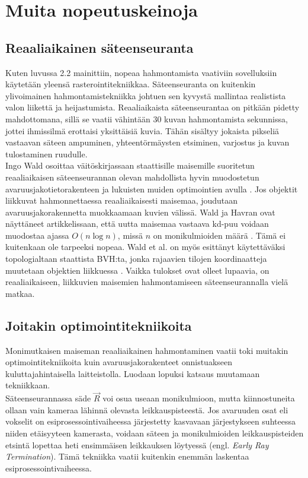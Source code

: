 \documentclass[a4paper, 12pt, titlepage]{article}
\begin{document}
\newpage
\section{Muita nopeutuskeinoja}
\subsection{Reaaliaikainen säteenseuranta}

Kuten luvussa 2.2 mainittiin, nopeaa hahmontamista vaativiin sovelluksiin käytetään yleensä rasterointitekniikkaa. Säteenseuranta on kuitenkin ylivoimainen hahmontamistekniikka johtuen sen kyvystä mallintaa realistista valon liikettä ja heijastumista. Reaaliaikaista säteenseurantaa on pitkään pidetty mahdottomana, sillä se vaatii vähintään 30 kuvan hahmontamista sekunnissa, jottei ihmissilmä erottaisi yksittäisiä kuvia. Tähän sisältyy jokaista pikseliä vastaavan säteen ampuminen, yhteentörmäysten etsiminen, varjostus ja kuvan tulostaminen ruudulle. \\

Ingo Wald osoittaa väitöskirjassaan staattisille maisemille suoritetun reaaliaikaisen säteenseurannan olevan mahdollista hyvin muodostetun avaruusjakotietorakenteen ja lukuisten muiden optimointien avulla \citep{wald04}. Jos objektit liikkuvat hahmonnettaessa reaaliaikaisesti maisemaa, joudutaan avaruusjakorakennetta muokkaamaan kuvien välissä. Wald ja Havran ovat näyttäneet artikkelissaan, että uutta maisemaa vastaava kd-puu voidaan muodostaa ajassa $O(n \log n)$, missä $n$ on monikulmioiden määrä \citep{wald06}. Tämä ei kuitenkaan ole tarpeeksi nopeaa. Wald et al. on myös esittänyt käytettäväksi topologialtaan staattista BVH:ta, jonka rajaavien tilojen koordinaatteja muutetaan objektien liikkuessa \citep{wald}. Vaikka tulokset ovat olleet lupaavia, on reaaliaikaiseen, liikkuvien maisemien hahmontamiseen säteenseurannalla vielä matkaa. 

\subsection{Joitakin optimointitekniikoita}

Monimutkaisen maiseman reaaliaikainen hahmontaminen vaatii toki muitakin optimointitekniikoita kuin avaruusjakorakenteet onnistuakseen kuluttajahintaisella laitteistolla. Luodaan lopuksi katsaus muutamaan tekniikkaan.\\

Säteenseurannassa säde $\vec{R}$ voi osua useaan monikulmioon, mutta kiinnostuneita ollaan vain kameraa lähinnä olevasta leikkauspisteestä. Jos avaruuden osat eli vokselit on esiprosessointivaiheessa järjestetty kasvavaan järjestykseen suhteessa niiden etäisyyteen kamerasta, voidaan säteen ja monikulmioiden leikkauspisteiden etsintä lopettaa heti ensimmäisen leikkauksen löytyessä (engl. \emph{Early Ray Termination}). Tämä tekniikka vaatii kuitenkin enemmän laskentaa esiprosessointivaiheessa. \citep{wald04}\\
\end{document}
